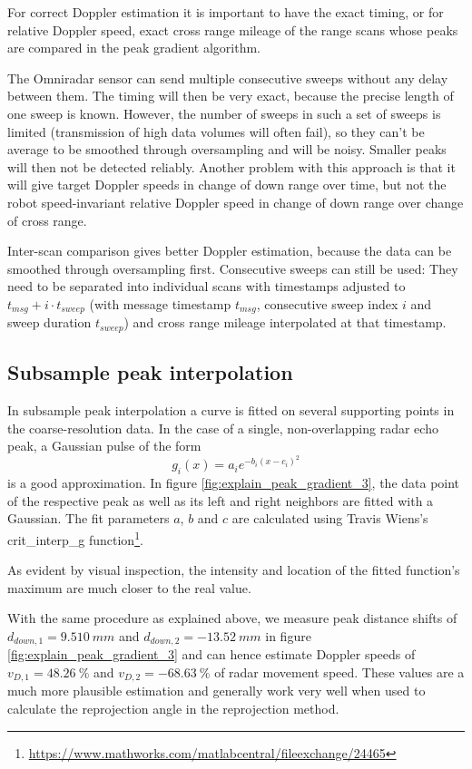 For correct Doppler estimation it is important to have the exact timing,
or for relative Doppler speed, exact cross range mileage of the range
scans whose peaks are compared in the peak gradient algorithm.

The Omniradar sensor can send multiple consecutive sweeps without any
delay between them. The timing will then be very exact, because the
precise length of one sweep is known. However, the number of sweeps in
such a set of sweeps is limited (transmission of high data volumes will
often fail), so they can't be average to be smoothed through
oversampling and will be noisy. Smaller peaks will then not be detected
reliably. Another problem with this approach is that it will give target
Doppler speeds in change of down range over time, but not the robot
speed-invariant relative Doppler speed in change of down range over
change of cross range.

Inter-scan comparison gives better Doppler estimation, because the data
can be smoothed through oversampling first. Consecutive sweeps can still
be used: They need to be separated into individual scans with timestamps
adjusted to \(t_{msg} + i\cdot t_{sweep}\) (with message timestamp
\(t_{msg}\), consecutive sweep index \(i\) and sweep duration
\(t_{sweep}\)) and cross range mileage interpolated at that timestamp.

\subsection{Subsample peak interpolation}\label{subsample-peak-interpolation}

In subsample peak interpolation a curve is fitted on several supporting
points in the coarse-resolution data. In the case of a single,
non-overlapping radar echo peak, a Gaussian pulse of the form
\[g_i(x) = a_i e^{-b_i ( x - c_i )^2}\] is a good approximation. In
figure \cref{fig:explain_peak_gradient_3}, the data point of the respective peak as well as its left
and right neighbors are fitted with a Gaussian. The fit parameters
\(a\), \(b\) and \(c\) are calculated using Travis
Wiens's crit\_interp\_g function\footnote{\url{https://www.mathworks.com/matlabcentral/fileexchange/24465}}.

As evident by visual inspection, the intensity and location of the
fitted function's maximum are much closer to the real value.

With the same procedure as explained above, we measure peak distance
shifts of \(d_{down,1}=\SI{9.510}{mm}\) and \(d_{down,2}=-\SI{13.52}{mm}\) in figure
\cref{fig:explain_peak_gradient_3} and can hence estimate Doppler speeds of \(v_{D,1}=\SI{48.26}{\%}\) and
\(v_{D,2}=-\SI{68.63}{\%}\) of radar movement speed. These values are a much
more plausible estimation and generally work very well when used to
calculate the reprojection angle in the reprojection method.

